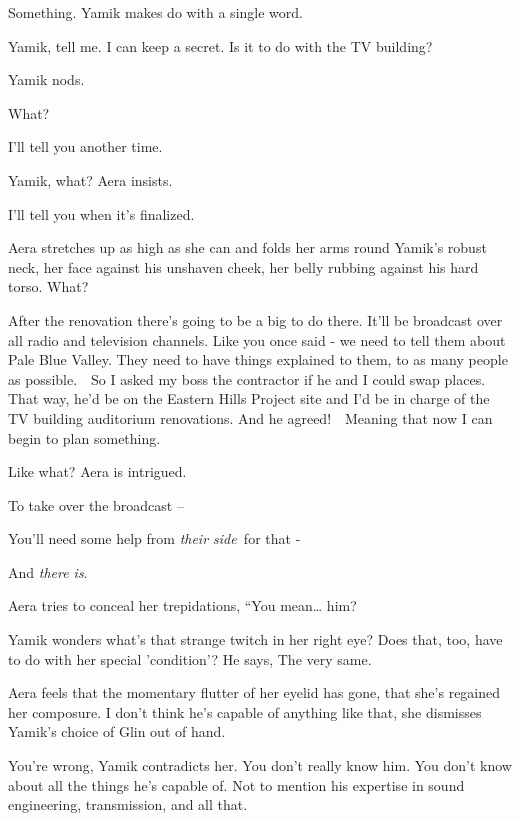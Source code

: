 \documentclass[letterpaper]{article}
\begin{document}
{\textquotedbl}Something.{\textquotedbl} Yamik makes do with a single word. 

{\textquotedbl}Yamik, tell me. I can keep a secret. Is it to do with the TV building?{\textquotedbl} 

Yamik nods. 

{\textquotedbl}What?{\textquotedbl} 

{\textquotedbl}I'll tell you another time.{\textquotedbl} 

{\textquotedbl}Yamik, what?{\textquotedbl} Aera insists.

{\textquotedbl}I'll tell you when it's finalized.{\textquotedbl} 

Aera stretches up as high as she can and folds her arms round Yamik's robust neck, her face against his unshaven cheek,
her belly rubbing against his hard torso. {\textquotedbl}What?{\textquotedbl} 

{\textquotedbl}After the renovation there's going to be a big to do there. It'll be broadcast over all radio and
television channels. Like you once said - we need to tell them about Pale Blue Valley. They need to have things
explained to them, to as many people as possible.\ \ So I asked my boss the contractor if he and I could swap places.
That way, he'd be on the Eastern Hills Project site and I'd be in charge of the TV building auditorium renovations. And
he agreed!\ \ Meaning that now I can begin to plan something.{\textquotedbl} 

{\textquotedbl}Like what?{\textquotedbl} Aera is intrigued. 

{\textquotedbl}To take over the broadcast --{\textquotedbl} 

{\textquotedbl}You'll need some help from \textit{their side\ }for that -{\textquotedbl} 

{\textquotedbl}And \textit{there is}.{\textquotedbl} 

Aera tries to conceal her trepidations, ``You mean{\dots} him?{\textquotedbl} 

Yamik wonders what's that strange twitch in her right eye? Does that, too, have to do with her special 'condition'? He
says, {\textquotedbl}The very same.{\textquotedbl} 

Aera feels that the momentary flutter of her eyelid has gone, that she's regained her composure. {\textquotedbl}I don't
think he's capable of anything like that,{\textquotedbl} she dismisses Yamik's choice of Glin out of hand. ~

{\textquotedbl}You're wrong,{\textquotedbl} Yamik contradicts her. {\textquotedbl}You don't really know him. You don't
know about all the things he's capable of. Not to mention his expertise in sound engineering, transmission, and all
that.{\textquotedbl} 
\end{document}
